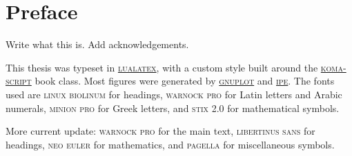 \chapter*{Preface}\noindent
Write what this is. Add acknowledgements.

This thesis was typeset in \href{http://www.luatex.org/}{\textsc{lualatex}}, with a custom style built around the \href{https://ctan.org/pkg/koma-script?lang=en}{\textsc{koma-script}} book class.
Most figures were generated by \href{http://www.gnuplot.info/}{\textsc{gnuplot}} and \href{https://ipe.otfried.org/}{\textsc{ipe}}.
The fonts used are \textsc{linux biolinum} for headings, \textsc{warnock pro} for Latin letters and Arabic numerals, \textsc{minion pro} for Greek letters, and \textsc{stix} 2.0 for mathematical symbols.

More current update: \textsc{warnock pro} for the main text, \textsc{libertinus sans} for headings, \textsc{neo euler} for mathematics, and \textsc{pagella} for miscellaneous symbols.
